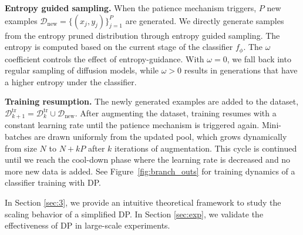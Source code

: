 \textbf{Entropy guided sampling.}  
When the patience mechanism triggers, $P$ new examples $\mathcal{D}_{\text{new}} = \{(x_j, y_j)\}_{j=1}^P$ are generated. We directly generate samples from the entropy pruned distribution through entropy guided sampling. The entropy is computed based on the current stage of the classifier $f_\phi$. The $\omega$ coefficient controls the effect of entropy-guidance. With $\omega=0$, we fall back into regular sampling of diffusion models, while  $\omega>0$ results in generations that have a higher entropy under the classifier.

\textbf{Training resumption.}  
The newly generated examples are added to the dataset, $\mathcal{D}_{k+1}^{\text{tr}} = \mathcal{D}_k^{\text{tr}} \cup \mathcal{D}_{\text{new}}$. After augmenting the dataset, training resumes with a constant learning rate until the patience mechanism is triggered again. Mini-batches are drawn uniformly from the updated pool, which grows dynamically from size $N$ to $N + kP$ after $k$ iterations of augmentation. This cycle is continued until we reach the cool-down phase where the learning rate is decreased and no more new data is added. See Figure~\ref{fig:branch_outs} for training dynamics of a classifier training with DP.

In Section \ref{sec:3}, we provide an intuitive theoretical framework to study the scaling behavior of a simplified DP. In Section \ref{sec:exp}, we validate the effectiveness of DP in large-scale experiments.


